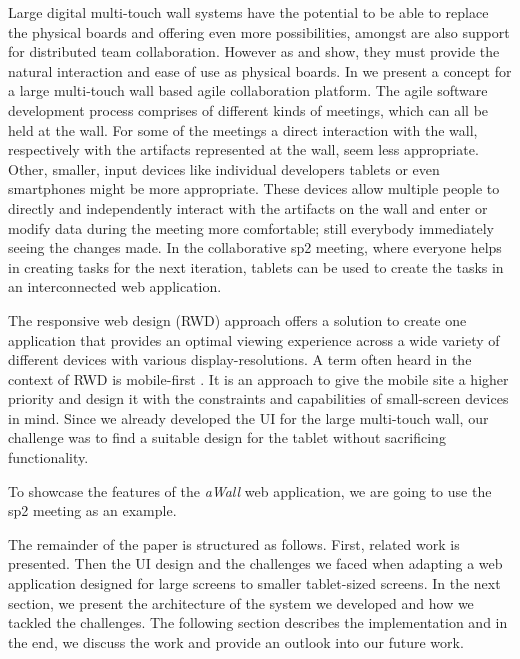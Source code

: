 \documentclass{sigchi}
\begin{document}
Large digital multi-touch wall systems have the potential to be able to replace the physical boards and offering even more possibilities, amongst are also support for distributed team collaboration. However as \cite{udcw:31721} and \cite{Mateescu:2015} show, they must provide the natural interaction and ease of use as physical boards. 
In \cite{Mateescu:2015} we present a concept for a large multi-touch wall based agile collaboration platform. The agile software development process comprises of different kinds of meetings, which can all be held at the wall. For some of the meetings a direct interaction with the wall, respectively with the artifacts represented at the wall, seem less appropriate. Other, smaller, input devices like individual developers tablets or even smartphones might be more appropriate. These devices allow multiple people to directly and independently interact with the artifacts on the wall and enter or modify data during the meeting more comfortable; still everybody immediately seeing the changes made. 
In the collaborative \gls{sp2} meeting, where everyone helps in creating tasks for the next iteration, tablets can be used to create the tasks in an interconnected web application.

The responsive web design (RWD) \cite{Marcotte:2011} approach offers a solution to create one application that provides an optimal viewing experience across a wide variety of different devices with various display-resolutions. 
A term often heard in the context of RWD is mobile-first \cite{Wroblewski:2011}. 
It is an approach to give the mobile site a higher priority and design it with the constraints and capabilities of small-screen devices in mind. 
Since we already developed the UI for the large multi-touch wall, our challenge was to find a suitable design for the tablet without sacrificing functionality.

To showcase the features of the \textit{aWall} web application, we are going to use the \gls{sp2} meeting as an example.

The remainder of the paper is structured as follows.
First, related work is presented.
Then the UI design and the challenges we faced when adapting a web application designed for large screens to smaller tablet-sized screens.
In the next section, we present the architecture of the system we developed and how we tackled the challenges.
The following section describes the implementation and in the end, we discuss the work and provide an outlook into our future work.
\end{document}
